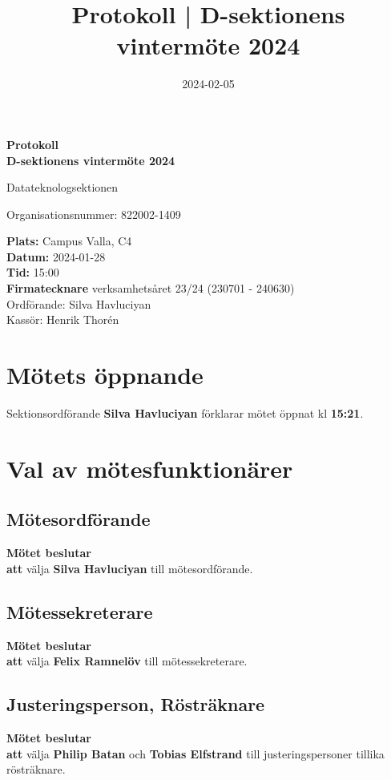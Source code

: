 \documentclass{datateknologsektionen-document}
\title{Protokoll | D-sektionens vintermöte 2024}
\date{2024-02-05}
\newcommand{\ind}{\hspace*{2em}}
\newcommand{\motetbeslutar}{\textbf{Mötet beslutar}}
\newcommand{\att}{\\\ind\textbf{att}}
\begin{document}
\hspace{0pt}
\vfill
\begin{center}
	\Huge\textbf{Protokoll \\ D-sektionens vintermöte 2024}

	\huge Datateknologsektionen

	\large
	Organisationsnummer: 822002-1409

\end{center}
\vfill
{\large
	\textbf{Plats:} Campus Valla, C4 \\
	\textbf{Datum:} 2024-01-28 \\
	\textbf{Tid:} 15:00 \\
	\textbf{Firmatecknare} verksamhetsåret 23/24 (230701 - 240630) \\
	\ind Ordförande: Silva Havluciyan \\
	\ind Kassör: Henrik Thorén
}
\vfill
\hspace{0pt}
\pagebreak




\tableofcontents
\pagebreak





\section{Mötets öppnande}
Sektionsordförande \textbf{Silva Havluciyan} förklarar mötet öppnat kl \textbf{15:21}.




\section{Val av mötesfunktionärer}
\subsection{Mötesordförande}
\motetbeslutar\att{} välja \textbf{Silva Havluciyan} till mötesordförande.

\subsection{Mötessekreterare}
\motetbeslutar\att{} välja \textbf{Felix Ramnelöv} till mötessekreterare.

\subsection{Justeringsperson, Rösträknare}
\motetbeslutar\att{} välja \textbf{Philip Batan} och \textbf{Tobias Elfstrand} till justeringspersoner tillika rösträknare.
\end{document}
